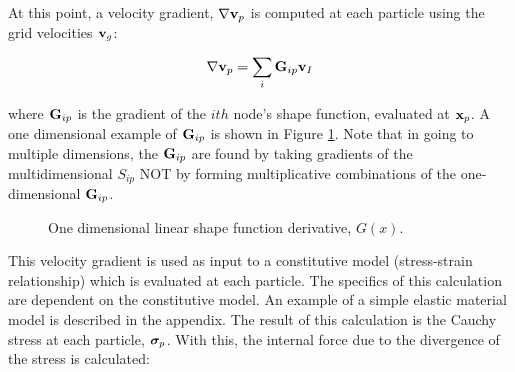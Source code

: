 \documentclass[10pt]{article}
\newcommand{\tn}[1]{\mbox{\bf{#1}}}
\newcommand{\sig}{\mbox{\boldmath $\sigma \!\!$ \unboldmath}}
\begin{document}
At this point, a velocity gradient,  $\nabla \tn{v}_p$ is 
computed at
each particle using the grid velocities $\tn{v}_g$:

\begin{eqnarray}
	\nabla \tn{v}_p = \sum_i \tn{G}_{ip} \tn{v}_I
 \label{velgrad}
\end{eqnarray}

\noindent
where $\tn{G}_{ip}$ is the gradient of the $ith$ node's shape 
function,
evaluated at $\tn{x}_p$.  A one dimensional example of 
$\tn{G}_{ip}$ is
shown in Figure \ref{fig-Gip}.  Note that in going to multiple dimensions,
the $\tn{G}_{ip}$ are found by taking gradients of the multidimensional
$S_{ip}$ NOT by forming multiplicative combinations of the one-dimensional
$\tn{G}_{ip}$.

\begin{figure}[h]
  \hspace{1.75in}
  \caption{\label{fig-Gip} One dimensional linear shape function 
           derivative, $G(x)$.}
\end{figure}
This velocity gradient is used as input to a constitutive model 
(stress-strain
relationship) which is evaluated at each particle.  The 
specifics of this 
calculation are dependent on the constitutive model.  An example 
of a simple elastic material model is described in the appendix.  
The result of this
calculation is the Cauchy stress at each particle, $\sig_p$.  
With this,
the internal force due to the divergence of the stress is 
calculated:
\end{document}
